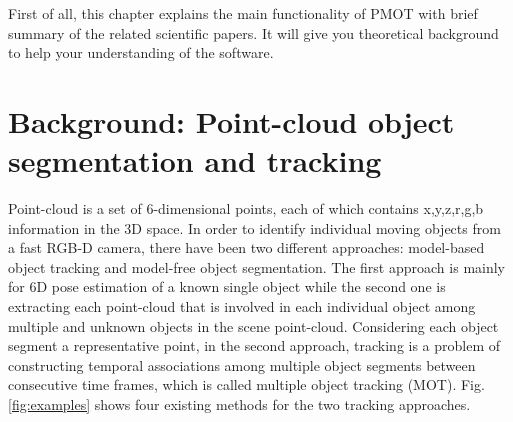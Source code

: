 \documentclass[a4paper,twoside, openright,12pt]{report}
\begin{document}
First of all, this chapter explains the main functionality of PMOT with brief summary of the related scientific papers.
It will give you theoretical background to help your understanding of the software.

\section{Background: Point-cloud object segmentation and tracking}
Point-cloud is a set of 6-dimensional points, each of which contains x,y,z,r,g,b information in the 3D space. In order to identify individual moving objects from a fast RGB-D camera, there have been two different approaches: model-based object tracking and model-free object segmentation. The first approach is mainly for 6D pose estimation of a known single object while the second one is extracting each point-cloud that is involved in each individual object among multiple and unknown objects in the scene point-cloud.
Considering each object segment a representative point, in the second approach, tracking is a problem of constructing temporal associations among multiple object segments between consecutive time frames, which is called multiple object tracking (MOT). Fig. \ref{fig:examples} shows four existing methods for the two tracking approaches. 
\end{document}
